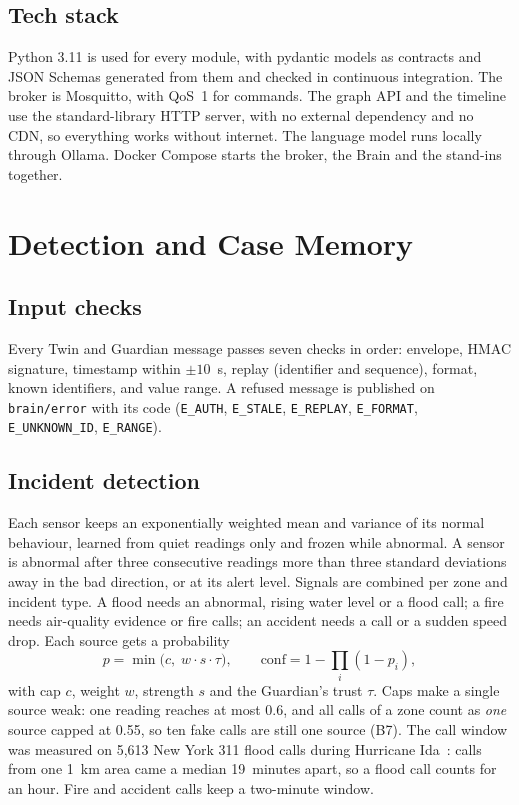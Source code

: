 \documentclass[conference]{IEEEtran}
\newcommand{\code}[1]{\texttt{\small #1}}
\begin{document}
\subsection{Tech stack}
Python 3.11 is used for every module, with pydantic models as contracts and JSON Schemas generated from them
and checked in continuous integration. The broker is Mosquitto, with QoS~1 for commands. The graph API and
the timeline use the standard-library HTTP server, with no external dependency and no CDN, so everything works without
internet. The language model runs locally through Ollama. Docker Compose starts the broker, the Brain and the
stand-ins together.

\section{Detection and Case Memory}
\subsection{Input checks}
Every Twin and Guardian message passes seven checks in order: envelope, HMAC signature, timestamp within
$\pm 10$~s, replay (identifier and sequence), format, known identifiers, and value range. A refused message is
published on \code{brain/error} with its code (\code{E\_AUTH}, \code{E\_STALE}, \code{E\_REPLAY},
\code{E\_FORMAT}, \code{E\_UNKNOWN\_ID}, \code{E\_RANGE}).

\subsection{Incident detection}
Each sensor keeps an exponentially weighted mean and variance of its normal behaviour, learned from quiet readings
only and frozen while abnormal. A sensor is abnormal after three consecutive readings more than three standard
deviations away in the bad direction, or at its alert level. Signals are combined per zone and incident type. A flood
needs an abnormal, rising water level or a flood call; a fire needs air-quality evidence or fire calls; an accident
needs a call or a sudden speed drop. Each source gets a probability
\begin{equation}
p = \min\bigl(c,\; w \cdot s \cdot \tau\bigr),\qquad
\text{conf} = 1 - \prod_i (1 - p_i),
\end{equation}
with cap $c$, weight $w$, strength $s$ and the Guardian's trust $\tau$. Caps make a single source weak: one reading reaches at most 0.6, and all calls of a zone count
as \emph{one} source capped at 0.55, so ten fake calls are still one source (B7). The call window was measured on
5,613 New York 311 flood calls during Hurricane Ida~\cite{nyc311}: calls from one 1~km area came a median 19~minutes apart,
so a flood call counts for an hour. Fire and accident calls keep a two-minute window.
\end{document}

